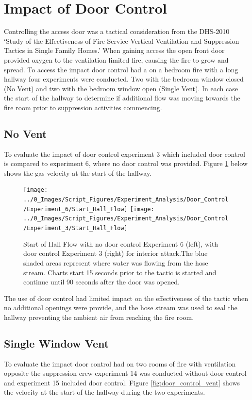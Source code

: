 \documentclass[12pt,oneside]{book}
\begin{document}
\section{Impact of Door Control}
Controlling the access door was a tactical consideration from the DHS-2010 `Study of the Effectiveness of Fire Service Vertical Ventilation and Suppression Tactics in Single Family Homes.' When gaining access the open front door provided oxygen to the ventilation limited fire, causing the fire to grow and spread. \cite{DHS2010} To access the impact door control had a on a bedroom fire with a long hallway four experiments were conducted. Two with the bedroom window closed (No Vent) and two with the bedroom window open (Single Vent). In each case the start of the hallway to determine if additional flow was moving towards the fire room prior to suppression activities commencing. 

\subsection{No Vent}
To evaluate the impact of door control experiment 3 which included door control is compared to experiment 6, where no door control was provided. Figure \ref{fig:door_control_no_vent} below shows the gas velocity at the start of the hallway. 

\begin{figure}[H]
\centering
\texttt{[image: ../0\_Images/Script\_Figures/Experiment\_Analysis/Door\_Control/Experiment\_6/Start\_Hall\_Flow]}
\texttt{[image: ../0\_Images/Script\_Figures/Experiment\_Analysis/Door\_Control/Experiment\_3/Start\_Hall\_Flow]}
\caption[Door Control Effectiveness - No Ventilation]{Start of Hall Flow with no door control Experiment 6 (left), with door control Experiment 3 (right) for interior attack.The blue shaded areas represent where water was flowing from the hose stream. Charts start 15 seconds prior to the tactic is started and continue until 90 seconds after the door was opened.}
\label{fig:door_control_no_vent}
\end{figure}

The use of door control had limited impact on the effectiveness of the tactic when no additional openings were provide, and the hose stream was used to seal the hallway preventing the ambient air from reaching the fire room.

\subsection{Single Window Vent}
To evaluate the impact door control had on two rooms of fire with ventilation opposite the suppression crew experiment 14 was conducted without door control and experiment 15 included door control. Figure \ref{fig:door_control_vent} shows the velocity at the start of the hallway during the two experiments.
\end{document}
